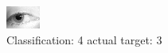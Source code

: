 \begin{figure}[h!]
\begin{center}
\includegraphics[width=0.60\columnwidth]{figures/ID1411_class_4_target_3.png}
\end{center}
\caption{ Classification: 4 actual target: 3}
\label{fig:ID1411_class_4_target_3}
\end{figure}
